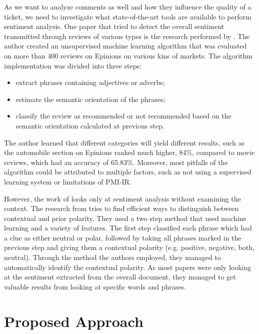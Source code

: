 \documentclass{mprop}
\begin{document}
As we want to analyze comments as well and how they influence the quality of a ticket, we
need to investigate what state-of-the-art tools are available to perform sentiment analysis.
One paper that tried to detect the overall sentiment transmitted through reviews of various 
types is the research performed by \citet{turney2002thumbs}. The author created an unsupervised
machine learning algorithm that was evaluated on more than 400 reviews on Epinions on various
kins of markets. The algorithm implementation was divided into three steps:
  \begin{itemize}
    \item extract phrases containing adjectives or adverbs;
    \item estimate the semantic orientation of the phrases;
    \item classify the review as recommended or not recommended based on
      the semantic orientation calculated at previous step.
  \end{itemize}
The author learned that different categories will yield different results, such as the
automobile section on Epinions ranked much higher, 84\%, compared to movie reviews, which
had an accuracy of 65.83\%. Moreover, most pitfalls of the algorithm could be attributed
to multiple factors, such as not using a supervised learning system or limitations of 
PMI-IR.

However, the work of \citet{turney2002thumbs} looks only at sentiment analysis without
examining the context. The research from \citet{wilson2005recognizing} tries to find
efficient ways to distinguish between contextual and prior polarity. They used a two 
step method that used machine learning and a variety of features. The first step 
classified each phrase which had a clue as either neutral or polar, followed by 
taking all phrases marked in the previous step and giving them a contextual polarity 
(e.g. positive, negative, both, neutral). Through the method the authors employed,
they managed to automatically identify the contextual polarity. As most papers were only
looking at the sentiment extracted from the overall document, they managed to get 
valuable results from looking at specific words and phrases.

\section{Proposed Approach}

\end{document}
